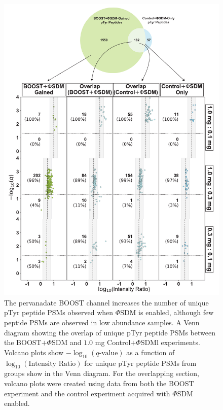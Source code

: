 \documentclass[journal=jprobs,manuscript=article]{achemso}
\begin{document}
\begin{figure}[t!]
\centering
\includegraphics[width=135mm]{figures/supplements/boostsdm_controlsdm_gained_qvolcanoes.pdf}
\caption{The pervanadate BOOST channel increases the number of unique pTyr peptide PSMs observed when $\Phi$SDM is enabled, although few peptide PSMs are observed in low abundance samples. A Venn diagram showing the overlap of unique pTyr peptide PSMs between the BOOST$+\Phi$SDM and $1.0$ mg Control$+\Phi$SDMl experiments. Volcano plots show $-\log_{10}(q\text{-value})$ as a function of $\log_{10}(\text{Intensity Ratio})$ for unique pTyr peptide PSMs from groups show in the Venn diagram. For the overlapping section, volcano plots were created using data from both the BOOST experiment and the control experiment acquired with $\Phi$SDM enabled. }\label{boostsdm_controlsdm_gained_qvolcanoes}
\end{figure}
\end{document}
